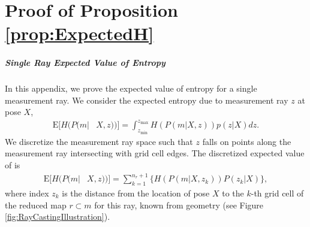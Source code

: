 \doublespacing
\chapter{Proof of Proposition \ref{prop:ExpectedH}}
\label{app:ExpectedRayEntropy}

\paragraph{Single Ray Expected Value of Entropy}

In this appendix, we prove the expected value of entropy for a single measurement ray. We consider the expected entropy due to measurement ray $z$ at pose $X$,
\begin{align}
\label{eqn:HRayInt}
\text{E}[H(P(m|&X,z))]
=\int_{z_\text{min}}^{z_\text{max}}
H(P(m|X,z))p(z|X)
dz.
\end{align}
We discretize the measurement ray space such that $z$ falls on points along the measurement ray intersecting with grid cell edges.
The discretized expected value of  is
\begin{align}
\label{eqn:DiscExpEntropyRayAppendix}
\text{E}[H(P(m|&X,z))]=\sum_{k=1}^{n_{r}+1}\bigg\{H(P(m|X,z_{k}))P(z_{k}|X)\bigg\},
\end{align}
where index $z_{k}$ is the distance from the location of pose $X$ to the $k$-th grid cell of the reduced map $r\subset m$ for this ray, known from geometry (see Figure \ref{fig:RayCastingIllustration}).

